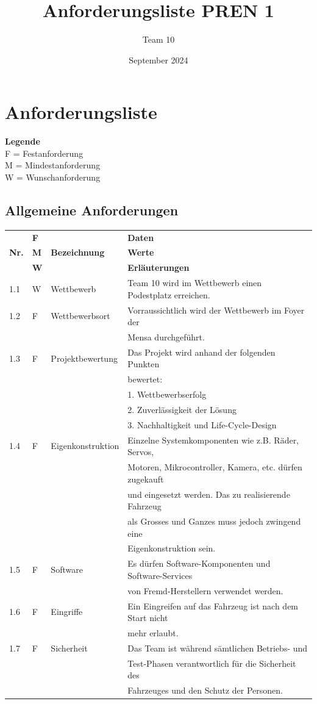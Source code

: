 \documentclass[11pt, a4paper]{article}
\title{Anforderungsliste PREN 1}
\author{Team 10}
\date{September 2024}
\begin{document}
\maketitle

\section{Anforderungsliste}
\textbf{Legende} \\ F = Festanforderung \\ M = Mindestanforderung \\ W = Wunschanforderung


\subsection{Allgemeine Anforderungen}
    \begin{tabular}{|l|l|l|l|}
    \hline
    & \textbf{F} & & \textbf{Daten} \\
    \textbf{Nr.} & \textbf{M} & \textbf{Bezeichnung} & \textbf{Werte} \\
    & \textbf{W} & & \textbf{Erläuterungen} \\
    \hline
    1.1 & W & Wettbewerb & Team 10 wird im Wettbewerb einen Podestplatz erreichen. \\
    \hline
    1.2 & F & Wettbewerbsort & Vorraussichtlich wird der Wettbewerb im Foyer der \\
    & & & Mensa durchgeführt. \\
    \hline
    1.3 & F & Projektbewertung & Das Projekt wird anhand der folgenden Punkten \\
    & & & bewertet: \\
    & & & 1. Wettbewerbserfolg \\
    & & & 2. Zuverlässigkeit der Lösung \\
    & & & 3. Nachhaltigkeit und Life-Cycle-Design \\
    \hline
    1.4 & F & Eigenkonstruktion & Einzelne Systemkomponenten wie z.B. Räder, Servos, \\
    & & & Motoren, Mikrocontroller, Kamera, etc. dürfen zugekauft \\
    & & & und eingesetzt werden. Das zu realisierende Fahrzeug \\
    & & & als Grosses und Ganzes muss jedoch zwingend eine \\
    & & & Eigenkonstruktion sein. \\
    \hline
    1.5 & F & Software & Es dürfen Software-Komponenten und Software-Services \\
    & & & von Fremd-Herstellern verwendet werden. \\
    \hline
    1.6 & F & Eingriffe & Ein Eingreifen auf das Fahrzeug ist nach dem Start nicht \\
    & & & mehr erlaubt. \\
    \hline
    1.7 & F & Sicherheit & Das Team ist während sämtlichen Betriebs- und \\
    & & & Test-Phasen verantwortlich für die Sicherheit des \\
    & & & Fahrzeuges und den Schutz der Personen. \\
    \hline
    \end{tabular}
\end{document}
